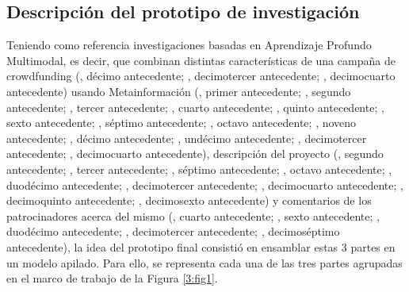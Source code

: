 \subsection{Descripción del prototipo de investigación}
Teniendo como referencia investigaciones basadas en Aprendizaje Profundo Multimodal, es decir, que combinan distintas características de una campaña de crowdfunding (\citeauthor{pr_kamath2018suplearn}, décimo antecedente; \citeauthor{pr_jin2019dayssuccess}, decimotercer antecedente; \citeauthor{pr_cheng2019deeplearning}, decimocuarto antecedente) usando Metainformación (\citeauthor{pr_chen2013kickpredict}, primer antecedente; \citeauthor{pr_mitra2014phrases}, segundo antecedente; \citeauthor{pr_zhou2015projectdesc}, tercer antecedente; \citeauthor{pr_chen2015predcrowd}, cuarto antecedente; \citeauthor{pr_beckwith2016predcrowd}, quinto antecedente; \citeauthor{pr_li2016predcrowd}, sexto antecedente; \citeauthor{pr_yuan2016textanalytics}, séptimo antecedente; \citeauthor{pr_sawhney2016usingLT}, octavo antecedente; \citeauthor{pr_kaur2017socmedcrowd}, noveno antecedente; \citeauthor{pr_kamath2018suplearn}, décimo antecedente; \citeauthor{pr_yu2018deeplearning}, undécimo antecedente; \citeauthor{pr_jin2019dayssuccess}, decimotercer antecedente; \citeauthor{pr_cheng2019deeplearning}, decimocuarto antecedente), descripción del proyecto (\citeauthor{pr_mitra2014phrases}, segundo antecedente; \citeauthor{pr_zhou2015projectdesc}, tercer antecedente; \citeauthor{pr_yuan2016textanalytics}, séptimo antecedente; \citeauthor{pr_sawhney2016usingLT}, octavo antecedente; \citeauthor{pr_lee2018contentDL}, duodécimo antecedente; \citeauthor{pr_jin2019dayssuccess}, decimotercer antecedente; \citeauthor{pr_cheng2019deeplearning}, decimocuarto antecedente; \citeauthor{pr_chen2019keywords_crowdfunding}, decimoquinto antecedente; \citeauthor{pr_chaichi2019nlp_3dprinting}, decimosexto antecedente) y comentarios de los patrocinadores acerca del mismo (\citeauthor{pr_chen2015predcrowd}, cuarto antecedente; \citeauthor{pr_li2016predcrowd}, sexto antecedente; \citeauthor{pr_lee2018contentDL}, duodécimo antecedente; \citeauthor{pr_jin2019dayssuccess}, decimotercer antecedente; \citeauthor{pr_shafqat2019topicpredictions}, decimoséptimo antecedente), la idea del prototipo final consistió en ensamblar estas 3 partes en un modelo apilado. Para ello, se representa cada una de las tres partes agrupadas en el marco de trabajo de la Figura \ref{3:fig1}.
